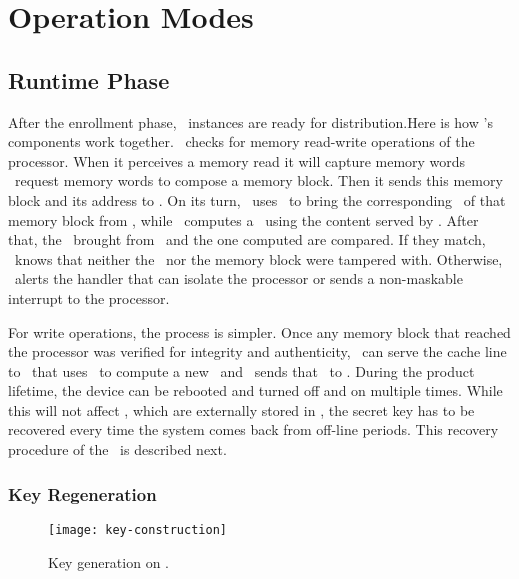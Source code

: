 \section{Operation Modes}
\label{sec:opmodes}



\subsection{Runtime Phase}
\label{subsec:runtimephase}
\def\fenroll{Figure \ref{fig:fuzzy-extractor} \subref{fig:fuzzy-enroll}}
\def\fregen{Figure \ref{fig:fuzzy-extractor} \subref{fig:fuzzy-regen}}
After the enrollment phase, \cshia~instances are ready for distribution.Here is how \cshia's components work together. \handler~checks for memory read-write operations of the processor. When it perceives a memory read it will capture memory words \andor~request memory words to compose a memory block. Then it sends this memory block and its address to \seceng. On its turn, \seceng~uses \pmmu~to bring the corresponding \ptag~of that memory block from \ptagmem, while \ptaggen~computes a \ptag~using the content served by \handler. After that, the \ptag~brought from \ptagmem~and the one computed are compared. If they match, \seceng~knows that neither the \ptag~nor the memory block were tampered with. Otherwise, \seceng~alerts the handler that can isolate the processor or sends a non-maskable interrupt to the processor.


For write operations, the process is simpler. Once any memory block that reached the processor was verified for integrity and authenticity, \handler~can serve the cache line to \seceng~that uses \ptaggen~to compute a new \ptag~and \pmmu~sends that \ptag~to \ptagmem.  During the product lifetime, the device can be rebooted and turned off and on multiple times. While this will not affect \ptags, which are externally stored in \ptagmem, the secret key has to be recovered every time the system comes back from off-line periods. This recovery procedure of the \fuzzy~is described next.

\subsubsection{Key Regeneration}
\label{subsubsec:Key-Regenation}
\begin{figure}[!t]
	\centering
	\texttt{[image: key-construction]}
	\caption{Key generation on \cshia.}
	\label{fig:key-construction}
\end{figure}

